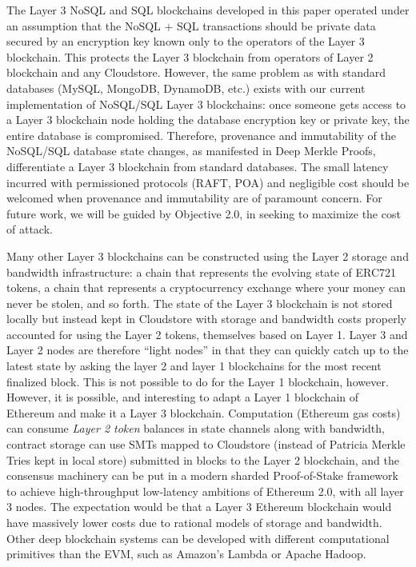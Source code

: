 \documentclass{article}
\begin{document}
The Layer 3 NoSQL and SQL blockchains developed in this paper operated under an assumption that the NoSQL + SQL transactions should be private data secured by an encryption key known only to the operators of the Layer 3 blockchain.   This protects the Layer 3 blockchain from operators of Layer 2 blockchain and any Cloudstore.  However, the same problem as with standard databases (MySQL, MongoDB, DynamoDB, etc.) exists with our current implementation of NoSQL/SQL Layer 3 blockchains: once someone gets access to a Layer 3 blockchain node holding the database encryption key or private key, the entire database is compromised. Therefore, provenance and immutability of the NoSQL/SQL database state changes, as manifested in Deep Merkle Proofs, differentiate a Layer 3 blockchain from standard databases. The small latency incurred with permissioned protocols (RAFT, POA) and negligible cost should be welcomed when provenance and immutability are of paramount concern.  For future work, we will be guided by Objective 2.0, in seeking to maximize the cost of attack.

Many other Layer 3 blockchains can be constructed using the Layer 2 storage and bandwidth infrastructure: a chain that represents the evolving state of ERC721 tokens, a chain that represents a cryptocurrency exchange where your money can never be stolen, and so forth.  The state of the Layer 3 blockchain is not stored locally but instead kept in Cloudstore with storage and bandwidth costs properly accounted for using the Layer 2 tokens, themselves based on Layer 1.  Layer 3 and Layer 2 nodes are therefore ``light nodes'' in that they can quickly catch up to the latest state by asking the layer 2 and layer 1 blockchains for the most recent finalized block.  This is not possible to do for the Layer 1 blockchain, however.  However, it is possible, and interesting to adapt a Layer 1 blockchain of Ethereum and make it a Layer 3 blockchain.  Computation (Ethereum gas costs) can consume {\em Layer 2 token} balances in state channels along with bandwidth, contract storage can use SMTs mapped to Cloudstore (instead of Patricia Merkle Tries kept in local store) submitted in blocks to the Layer 2 blockchain, and the consensus machinery can be put in a modern sharded Proof-of-Stake framework to achieve high-throughput low-latency ambitions of Ethereum 2.0, with all layer 3 nodes.  The expectation would be that a Layer 3 Ethereum blockchain would have massively lower costs due to rational models of storage and bandwidth.   Other deep blockchain systems can be developed with different computational primitives than the EVM, such as Amazon's Lambda or Apache Hadoop.
\end{document}
